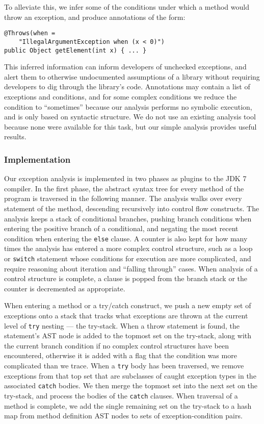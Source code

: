 To alleviate this, we infer some of the conditions under which a method would
throw an exception, and produce annotations of the form:

\begin{verbatim}
@Throws(when =
    "IllegalArgumentException when (x < 0)")
public Object getElement(int x) { ... }
\end{verbatim}

This inferred information can inform developers of unchecked exceptions,
and alert them to otherwise undocumented assumptions of a library without
requiring developers to dig through the library's code.
Annotations may contain a list of exceptions and conditions, and for some
complex conditions we reduce the condition to ``sometimes'' because our analysis
performs no symbolic execution, and is only based on syntactic structure.  We do not use an
existing analysis tool because none were available for this task, but our
simple analysis provides useful results.

\subsubsection{Implementation}

Our exception analysis is implemented in two phases as plugins to the JDK 7 compiler.
In the first phase, the
abstract syntax tree for every method of the program is traversed in the
following manner.  The analysis walks over every statement of the method,
descending recursively into control flow constructs.  The analysis keeps a stack
of conditional branches, pushing branch conditions when entering the positive
branch of a conditional, and negating the most recent condition when entering
the \texttt{else} clause.  A counter is also kept for how many times the
analysis has entered a more complex control structure, such as a loop or
\texttt{switch} statement whose conditions for execution are more complicated,
and require reasoning about iteration and ``falling through'' cases.  When
analysis of a control structure is complete, a clause is popped from the
branch stack or the counter is decremented as appropriate.

When entering a method or a try/catch construct, we push a new empty set of exceptions onto
a stack that tracks what exceptions are thrown at the current level of
\texttt{try} nesting --- the try-stack.
When a throw statement is found, the statement's AST node is added to the
topmost set on the try-stack, 
along with the current branch condition if no complex control structures have
been encountered, otherwise it is added with a flag that the condition was more
complicated than we trace.  When a \texttt{try} body has been traversed, we
remove exceptions from that top set that are subclasses of caught exception
types in the associated \texttt{catch} bodies.  We then merge the topmost set
into the next set on the try-stack, and process the bodies of
the \texttt{catch} clauses.  When traversal of a method is complete, we add the
single remaining set on the try-stack to a hash map from method definition AST
nodes to sets of exception-condition pairs.

